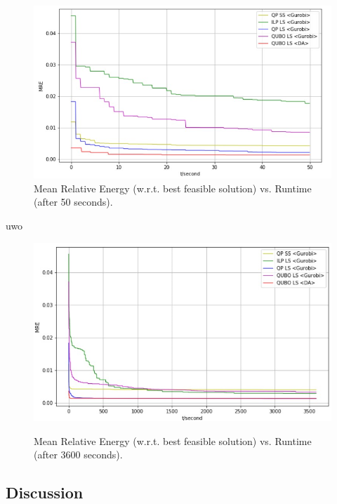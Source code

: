 \documentclass[preprint,12pt]{elsarticle}
\begin{document}
\begin{figure}[t]%
	
	\includegraphics[width=\textwidth]{energy_50.png}  
	\caption{Mean Relative Energy (w.r.t. best feasible solution) vs. Runtime (after 50 seconds).}%
	
	\label{fig:results1}%
\end{figure}

uwo\begin{figure}[t]%
	
	\includegraphics[width=\textwidth]{energy_3600.png}   \\%
	\caption{Mean Relative Energy (w.r.t. best feasible solution) vs. Runtime (after 3600 seconds).}%
	
	\label{fig:results2}%
\end{figure}



\subsection{Discussion}
\end{document}
